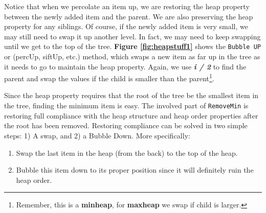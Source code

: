 Notice that when we percolate an item up, we are restoring the heap property between the newly added item and the parent. We are also preserving the heap property for any siblings. Of course, if the newly added item is very small, we may still need to swap it up another level. In fact, we may need to keep swapping until we get to the top of the tree. \textbf{Figure \ref{fig:heapstuff1}} shows the \texttt{Bubble UP} or (percUp, siftUp, etc.) method, which swaps a new item as far up in the tree as it needs to go to maintain the heap property. Again, we use \textbf{\emph{i / 2}} to find the parent and swap the values if the child is smaller than the parent\footnote{Remember, this is a \textbf{minheap}, for \textbf{maxheap} we swap if child is larger.}.\\


Since the heap property requires that the root of the tree be the smallest item in the tree, finding the minimum item is easy. The involved part of \texttt{RemoveMin} is restoring full compliance with the heap structure and heap order properties after the root has been removed. Restoring compliance can be solved in two simple steps: 1) A swap, and 2) a Bubble Down. More specifically:



\begin{enumerate}
	\def\labelenumi{\arabic{enumi}.}
	\tightlist
	\item
	      Swap the last item in the heap (from the back) to the top of the heap. 
	\item
	      Bubble this item down to its proper position since it will definitely ruin the heap order. 
\end{enumerate}


